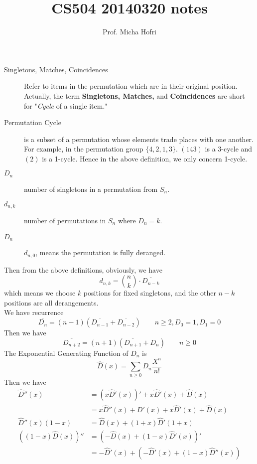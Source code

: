 \message{ !name(20140320.tex)}\documentclass{article}
\author{Prof. Micha Hofri}
\title{CS504 20140320 notes}
\begin{document}

\maketitle
\begin{description}
\item[Singletons, Matches, Coincidences] Refer to items in the
  permutation which are in their original position. Actually, the term
  \textbf{Singletons, Matches,} and \textbf{Coincidences} are
  short for "\emph{Cycle} of a single item."
\item[Permutation Cycle] is a subset of a permutation whose elements
  trade places with one another. For example, in the permutation group
  $\{4,2,1,3\}$. $(143)$ is a 3-cycle and $(2)$ is a 1-cycle. Hence in
  the above definition, we only concern 1-cycle.
\item[$D_n$] number of singletons in a permutation from $S_n$.
\item[$d_{n,k}$] number of permutations in $S_n$ where $D_n=k$.
\item[$\overline{D_n}$] $d_{n,0}$, means the permutation is fully deranged.
\end{description}
Then from the above definitions, obviously, we have \\
\[
d_{n,k}=\binom{n}{k}\cdot\overline{D_{n-k}}
\]
which means we choose $k$ positions for fixed  singletons, and the
other $n-k$ positions are all derangements.\\
We have recurrence
\[
\overline{D_n}=(n-1)(\overline{D_{n-1}}+\overline{D_{n-2}})\qquad
n\geq 2, D_0=1,D_1=0
\]
Then we have
\[
\overline{D_{n+2}}=(n+1)(\overline{D_{n+1}}+D_n)\qquad n\geq 0
\]
The Exponential Generating Function of $D_n$ is
\[
\hat{D}(x)=\sum_{n\geq 0}D_n\frac{X^n}{n!}
\]
Then we have\\
\begin{align*}
\hat{D}''(x)&=(x\hat{D}'(x))'+x\hat{D}'(x)+\hat{D}(x)\\
&=x\hat{D}''(x)+D'(x)+x\hat{D}'(x)+\hat{D}(x)\\
\hat{D}''(x)(1-x)&=\hat{D}(x)+(1+x)\hat{D}'(1+x)\\
\left((1-x)\hat{D}(x)\right)''&=(-\hat{D}(x)+(1-x)\hat{D}'(x))'\\
&=-\hat{D}'(x)+(-\hat{D}'(x)+(1-x)\hat{D}''(x))

\end{align*}
\end{document}
